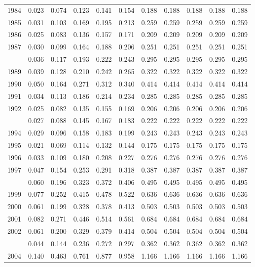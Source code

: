 \documentclass[
]{article}
\begin{document}
\begin{longtable}[t]{lrrrrrrrrrr}
1984 & 0.023 & 0.074 & 0.123 & 0.141 & 0.154 & 0.188 & 0.188 & 0.188 & 0.188 & 0.188\\
1985 & 0.031 & 0.103 & 0.169 & 0.195 & 0.213 & 0.259 & 0.259 & 0.259 & 0.259 & 0.259\\
1986 & 0.025 & 0.083 & 0.136 & 0.157 & 0.171 & 0.209 & 0.209 & 0.209 & 0.209 & 0.209\\
1987 & 0.030 & 0.099 & 0.164 & 0.188 & 0.206 & 0.251 & 0.251 & 0.251 & 0.251 & 0.251\\
\addlinespace
1988 & 0.036 & 0.117 & 0.193 & 0.222 & 0.243 & 0.295 & 0.295 & 0.295 & 0.295 & 0.295\\
1989 & 0.039 & 0.128 & 0.210 & 0.242 & 0.265 & 0.322 & 0.322 & 0.322 & 0.322 & 0.322\\
1990 & 0.050 & 0.164 & 0.271 & 0.312 & 0.340 & 0.414 & 0.414 & 0.414 & 0.414 & 0.414\\
1991 & 0.034 & 0.113 & 0.186 & 0.214 & 0.234 & 0.285 & 0.285 & 0.285 & 0.285 & 0.285\\
1992 & 0.025 & 0.082 & 0.135 & 0.155 & 0.169 & 0.206 & 0.206 & 0.206 & 0.206 & 0.206\\
\addlinespace
1993 & 0.027 & 0.088 & 0.145 & 0.167 & 0.183 & 0.222 & 0.222 & 0.222 & 0.222 & 0.222\\
1994 & 0.029 & 0.096 & 0.158 & 0.183 & 0.199 & 0.243 & 0.243 & 0.243 & 0.243 & 0.243\\
1995 & 0.021 & 0.069 & 0.114 & 0.132 & 0.144 & 0.175 & 0.175 & 0.175 & 0.175 & 0.175\\
1996 & 0.033 & 0.109 & 0.180 & 0.208 & 0.227 & 0.276 & 0.276 & 0.276 & 0.276 & 0.276\\
1997 & 0.047 & 0.154 & 0.253 & 0.291 & 0.318 & 0.387 & 0.387 & 0.387 & 0.387 & 0.387\\
\addlinespace
1998 & 0.060 & 0.196 & 0.323 & 0.372 & 0.406 & 0.495 & 0.495 & 0.495 & 0.495 & 0.495\\
1999 & 0.077 & 0.252 & 0.415 & 0.478 & 0.522 & 0.636 & 0.636 & 0.636 & 0.636 & 0.636\\
2000 & 0.061 & 0.199 & 0.328 & 0.378 & 0.413 & 0.503 & 0.503 & 0.503 & 0.503 & 0.503\\
2001 & 0.082 & 0.271 & 0.446 & 0.514 & 0.561 & 0.684 & 0.684 & 0.684 & 0.684 & 0.684\\
2002 & 0.061 & 0.200 & 0.329 & 0.379 & 0.414 & 0.504 & 0.504 & 0.504 & 0.504 & 0.504\\
\addlinespace
2003 & 0.044 & 0.144 & 0.236 & 0.272 & 0.297 & 0.362 & 0.362 & 0.362 & 0.362 & 0.362\\
2004 & 0.140 & 0.463 & 0.761 & 0.877 & 0.958 & 1.166 & 1.166 & 1.166 & 1.166 & 1.166\\

\end{longtable}
\end{document}
